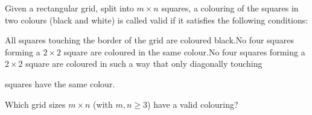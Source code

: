 Given a rectangular grid, split into $m\times n$ squares, a colouring of the squares in two colours (black and white) is called valid if it satisfies the following conditions:

All squares touching the border of the grid are coloured black.No four squares forming a $2\times 2$ square are coloured in the same colour.No four squares forming a $2\times 2$ square are coloured in such a way that only diagonally touching

squares have the same colour.

Which grid sizes $m\times n$ (with $m,n\ge 3$) have a valid colouring?